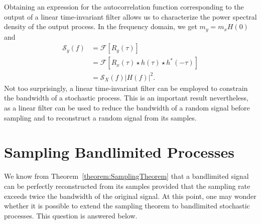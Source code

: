 Obtaining an expression for the autocorrelation function corresponding to the output of a linear time-invariant filter allows us to characterize the power spectral density of the output process.
In the frequency domain, we get $m_y = m_x H(0)$ and
\begin{equation*}
\begin{split}
\mathcal{S}_y (f) &= \mathcal{F} [ R_y (\tau) ] \\
&= \mathcal{F} \left[ R_x (\tau) \star h(\tau) \star h^*(-\tau) \right] \\
&= \mathcal{S}_X(f) |H(f)|^2 .
\end{split}
\end{equation*}
Not too surprisingly, a linear time-invariant filter can be employed to constrain the bandwidth of a stochastic process.
This is an important result nevertheless, as a linear filter can be used to reduce the bandwidth of a random signal before sampling and to reconstruct a random signal from its samples.


\section{Sampling Bandlimited Processes}

We know from Theorem~\ref{theorem:SamplingTheorem} that a bandlimited signal can be perfectly reconstructed from its samples provided that the sampling rate exceeds twice the bandwidth of the original signal.
At this point, one may wonder whether it is possible to extend the sampling theorem to bandlimited stochastic processes.
This question is answered below.

